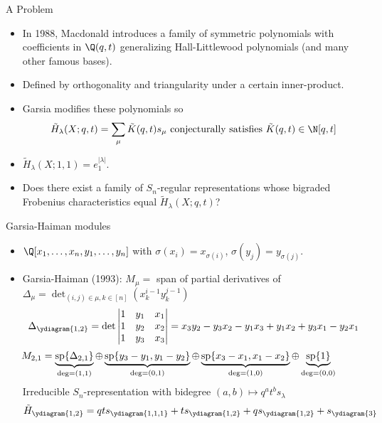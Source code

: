 \documentclass[dvipsnames,handout]{beamer}
\renewcommand{\Span}{\operatorname{sp}}
\theoremstyle{definition}
\newcounter{c}
\begin{document}
\begin{frame}{A Problem}
  \begin{itemize}
  \item In 1988, Macdonald introduces a family of symmetric
    polynomials with coefficients in \(\Q(q,t)\) generalizing
    Hall-Littlewood polynomials (and many other famous bases).\pause
  \item Defined by orthogonality and triangularity under a certain
    inner-product. \pause
  \item Garsia modifies these polynomials so 
    \[
      \tilde{H}_\lambda(X;q,t) = \sum_\mu \tilde{K}(q,t) s_\mu \text{
        conjecturally satisfies }\tilde{K}(q,t) \in \N[q,t]
    \]\pause
  \item \(\tilde{H}_\lambda(X;1,1) = e_1^{|\lambda|}\).\pause
  \item Does there
    exist a family of \(S_n\)-regular representations whose bigraded
    Frobenius characteristics equal \(\tilde{H}_\lambda(X;q,t)\)?
  \end{itemize}
\end{frame}
\begin{frame}{Garsia-Haiman modules}
  \begin{itemize}
  \item \(\Q[x_1,\ldots,x_n,y_1,\ldots,y_n]\) with 
    \(\sigma(x_i) = x_{\sigma(i)}\), \(\sigma(y_j) = y_{\sigma(j)}\).\pause
  \item Garsia-Haiman (1993): \(M_\mu = \) span of partial derivatives of
    \(\Delta_\mu = \det_{(i,j) \in \mu, k \in [n]} (x_k^{i-1} y_k^{j-1})\) \pause \[
      \Delta_{\ydiagram{1,2}} = \det \left|
        \begin{matrix}
          1 & y_1 & x_1 \\
          1 & y_2 & x_2 \\
          1 & y_3 & x_3
        \end{matrix}
      \right| = x_3 y_2 - y_3 x_2 - y_1 x_3 + y_1 x_2 + y_3 x_1 - y_2 x_1
    \]
    \pause
  \[
    \hspace{-3em}
      M_{2,1} = \underbrace{\Span\{\Delta_{2,1}\}}_{\deg = (1,1)}
      \oplus \underbrace{\Span\{y_3-y_1, y_1 - y_2\}}_{\deg = (0,1)}
      \oplus \underbrace{\Span\{x_3-x_1, x_1 - x_2\}}_{\deg = (1,0)}
      \oplus \underbrace{\Span \{1\}}_{\deg = (0,0)}
    \]
    \pause
    Irreducible \(S_n\)-representation with bidegree \((a,b) \mapsto
    q^at^b s_\lambda\) \pause \[
      \tilde{H}_{\ydiagram{1,2}} = qt s_{\ydiagram{1,1,1}} + t
      s_{\ydiagram{1,2}} + q s_{\ydiagram{1,2}} + s_{\ydiagram{3}}
    \]
  \end{itemize}
\end{frame}
\end{document}
